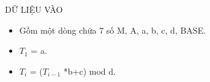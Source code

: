 DỮ LIỆU VÀO  
\begin{itemize}
	\item     Gồm một dòng chứa 7 số M, A, a, b, c, d, BASE.   
	\item     $T_{1}$    = a.   
	\item     $T_{i}$    = ($T_{i-1}$    *b+c) mod d.   
\end{itemize}